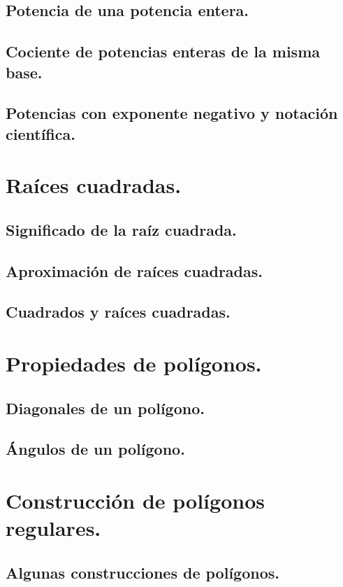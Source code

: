 \documentclass[11pt]{book}
\begin{document}
\subsection{Potencia de una potencia entera.}
\subsection{Cociente de potencias enteras de la misma base.}
\subsection{Potencias con exponente negativo y notación científica.}

\section{Raíces cuadradas.}
\subsection{Significado de la raíz cuadrada.}
\subsection{Aproximación de raíces cuadradas.}
\subsection{Cuadrados y raíces cuadradas.}

\section{Propiedades de polígonos.}
\subsection{Diagonales de un polígono.}
\subsection{Ángulos de un polígono.}

\section{Construcción de polígonos regulares.}
\subsection{Algunas construcciones de polígonos.}
\end{document}

